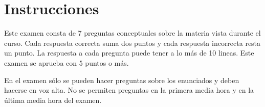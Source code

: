 
\section*{Instrucciones}

Este examen consta de 7 preguntas conceptuales sobre la materia vista durante el curso. Cada respuesta correcta suma dos puntos y cada respuesta incorrecta resta un punto. La respuesta a cada pregunta puede tener a lo más de 10 lineas. 
Este examen se aprueba con 5 puntos o más.

En el examen sólo se pueden hacer preguntas sobre los enunciados y deben hacerse en voz alta. No se permiten preguntas en la primera media hora y en la última media hora del examen.
